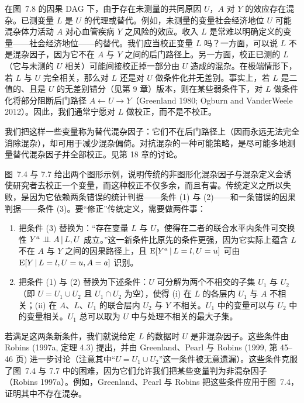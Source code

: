 \begin{finepoint}[替代混杂因子]
在图~7.8 的因果 DAG 下，由于存在未测量的共同原因 $U$，$A$ 对 $Y$ 的效应存在混杂。已测变量 $L$ 是 $U$ 的代理或替代。例如，未测量的变量社会经济地位 $U$ 可能混杂体力活动 $A$ 对心血管疾病 $Y$ 之风险的效应。收入 $L$ 是常难以明确定义的变量——社会经济地位——的替代。我们应当校正变量 $L$ 吗？一方面，可以说 $L$ 不是混杂因子，因为它不在 $A$ 与 $Y$ 之间的后门路径上。另一方面，校正已测的 $L$（它与未测的 $U$ 相关）可能间接校正掉一部分由 $U$ 造成的混杂。在极端情形下，若 $L$ 与 $U$ 完全相关，那么对 $L$ 还是对 $U$ 做条件化并无差别。事实上，若 $L$ 是二值的、且是 $U$ 的无差别错分（见第 9 章）版本，则在某些弱条件下，对 $L$ 做条件化将部分阻断后门路径 $A\leftarrow U\to Y$（Greenland 1980; Ogburn and VanderWeele 2012）。因此，我们通常宁愿对 $L$ 做校正，而不是不校正。

我们把这样一些变量称为替代混杂因子：它们不在后门路径上（因而永远无法完全消除混杂），却可用于减少混杂偏倚。对抗混杂的一种可能策略，是尽可能多地测量替代混杂因子并全部校正。见第 18 章的讨论。
\end{finepoint}

\begin{techpoint}[修正传统的混杂因子定义]
图~7.4 与 7.7 给出两个图形示例，说明传统的非图形化混杂因子与混杂定义会诱使研究者去校正一个变量，而这种校正不仅多余，而且有害。传统定义之所以失败，是因为它依赖两条错误的统计判据——条件 (1) 与 (2)——和一条错误的因果判据——条件 (3)。要“修正”传统定义，需要做两件事：

\begin{enumerate}
\item 把条件 (3) 替换为：“存在变量 $L$ 与 $U$，使得在二者的联合水平内条件可交换性 $Y^{a}\perp\!\!\!\perp A\,|\, L,U$ 成立。”这一新条件比原先的条件更强，因为它实际上蕴含 $L$ 不在 $A$ 与 $Y$ 之间的因果路径上，且 $\mathrm{E}[Y^{a}\,|\, L=l,U=u]$ 可由 $\mathrm{E}[Y\,|\, L=l,U=u,A=a]$ 识别。
\item 把条件 (1) 与 (2) 替换为下述条件：$U$ 可分解为两个不相交的子集 $U_1$ 与 $U_2$（即 $U=U_1\cup U_2$ 且 $U_1\cap U_2$ 为空），使得 (i) 在 $L$ 的各层内 $U_1$ 与 $A$ 不相关；(ii) 在 $A$、$L$、$U_1$ 的联合层内 $U_2$ 与 $Y$ 不相关。$U_1$ 中的变量可以与 $U_2$ 中的变量相关。$U_1$ 总可以取为 $U$ 中与处理不相关的最大子集。
\end{enumerate}

若满足这两条新条件，我们就说给定 $L$ 的数据时 $U$ 是非混杂因子。这些条件由 Robins (1997a, 定理 4.3) 提出，并由 Greenland、Pearl 与 Robins (1999, 第 45–46 页) 进一步讨论（注意其中“$U=U_1\cup U_2$”这一条件被无意遗漏）。这些条件克服了图~7.4 与 7.7 中的困难，因为它们允许我们把某些变量判为非混杂因子（Robins 1997a）。例如，Greenland、Pearl 与 Robins 把这些条件应用于图~7.4，证明其中不存在混杂。
\end{techpoint}
\renewcommand{\TPname}{技术注记}

